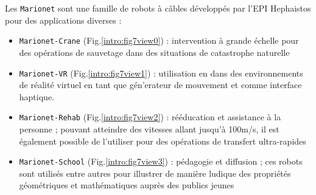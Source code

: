Les {\tt Marionet} sont une famille de robots à câbles développés par l'EPI 
Hephaistos pour des applications diverses \cite{merlet2010marionet} :
\begin{itemize}
 \item {\tt Marionet-Crane} (Fig.\ref{intro:fig7view0}) : intervention à grande 
échelle pour des opé\-rations de sauvetage dans des situations de catastrophe 
naturelle
 \item {\tt Marionet-VR} (Fig.\ref{intro:fig7view1}) : utilisation en dans des 
environnements de r\'ealit\'e virtuel en tant que g\'en'erateur de mouvement et 
comme interface haptique. 
 \item {\tt Marionet-Rehab} (Fig.\ref{intro:fig7view2}) : rééducation et 
assistance à la personne ; pouvant atteindre des vitesses allant jusqu'à 
100m/s, 
il est également possible de l'utiliser pour des opérations de transfert 
ultra-rapides
 \item {\tt Marionet-School} (Fig.\ref{intro:fig7view3}) : pédagogie et 
diffusion ; ces robots sont utilisés entre autres pour illustrer de manière 
ludique des propriétés géomé\-triques et mathématiques auprès des publics jeunes
\end{itemize}

